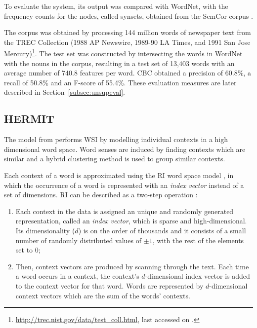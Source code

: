 To evaluate the system, its output was compared with WordNet, with the
frequency counts for the nodes, called synsets, obtained from the SemCor corpus 
\citep{miller1993semantic}.

The corpus was obtained by processing 144 million words of newspaper text from 
the TREC Collection (1988 AP Newswire, 1989-90 LA Times, and 1991 San Jose 
Mercury)\footnote{\url{http://trec.nist.gov/data/test_coll.html}, last 
accessed on .}. The test set was constructed by 
intersecting the words in WordNet 
with the nouns in the corpus, resulting in a test set of 13,403 words with an 
average number of 740.8 features per word. \ac{CBC} obtained a precision of 
60.8\%, a recall of 50.8\% and an F-score of 55.4\%. These evaluation 
measures are later described in Section~\ref{subsec:unsupeval}.

\subsection{HERMIT}

The model from \citet{jurgens2010hermit} performs \ac{WSI} by modelling 
individual contexts in a high dimensional word space. Word senses are induced 
by finding contexts which are similar and a hybrid clustering method is used to 
group similar contexts.

Each context of a word is approximated using the \ac{RI} word space model
\citep{kanerva2000random}, in which the occurrence of a word is represented with
an \textit{index vector} instead of a set of dimensions. \ac{RI} can be 
described as a two-step operation \citep{sahlgren2005introduction}:

\begin{enumerate}
 \item Each context in the data is assigned an unique and randomly generated
 representation, called an \textit{index vector}, which is sparse and
 high-dimensional. Its dimensionality ($d$) is on the order of thousands and
 it consists of a small number of randomly distributed values of $\pm1$, with 
 the rest of the elements set to $0$;
 \item Then, context vectors are produced by scanning through the text. Each
 time a word occurs in a context, the context's $d$-dimensional index vector is
 added to the context vector for that word. Words are represented by
 $d$-dimensional context vectors which are the sum of the words' contexts.
\end{enumerate}

